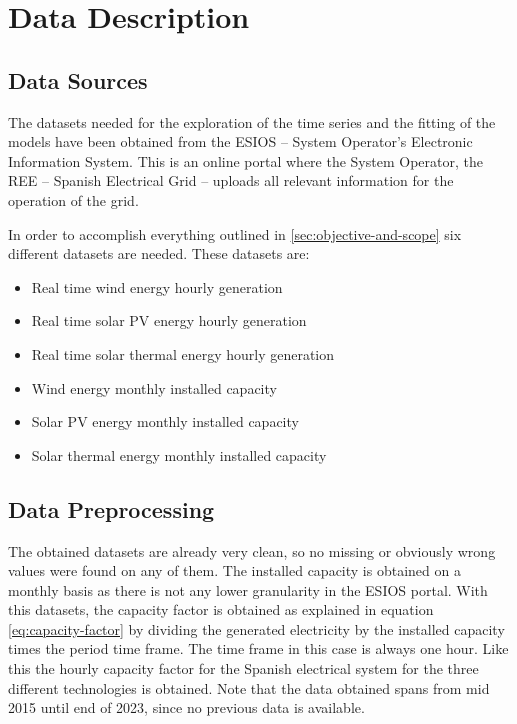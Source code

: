 \section{Data Description}
\label{sec:data-description}
\subsection{Data Sources}
The datasets needed for the exploration of the time series and the fitting of the models have been obtained from the ESIOS -- System Operator's Electronic Information System. This is an online portal where the System Operator, the REE -- Spanish Electrical Grid -- uploads all relevant information for the operation of the grid. 

In order to accomplish everything outlined in \autoref{sec:objective-and-scope} six different datasets are needed. These datasets are:
\begin{itemize}
    \item Real time wind energy hourly generation
    \item Real time solar PV energy hourly generation
    \item Real time solar thermal energy hourly generation
    \item Wind energy monthly installed capacity
    \item Solar PV energy monthly installed capacity
    \item Solar thermal energy monthly installed capacity
\end{itemize}


\subsection{Data Preprocessing}
The obtained datasets are already very clean, so no missing or obviously wrong values were found on any of them. The installed capacity is obtained on a monthly basis as there is not any lower granularity in the ESIOS portal. With this datasets, the capacity factor is obtained as explained in equation \eqref{eq:capacity-factor} by dividing the generated electricity by the installed capacity times the period time frame. The time frame in this case is always one hour. Like this the hourly capacity factor for the Spanish electrical system for the three different technologies is obtained. Note that the data obtained spans from mid 2015 until end of 2023, since no previous data is available. 

